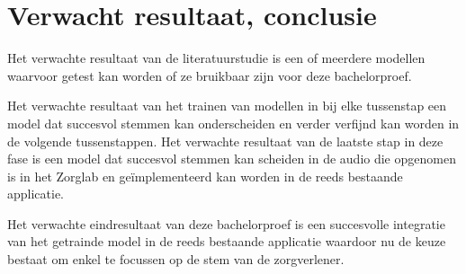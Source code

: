 \section{Verwacht resultaat, conclusie}%
\label{sec:verwachte_resultaten}

Het verwachte resultaat van de literatuurstudie is een of meerdere modellen waarvoor getest kan worden of ze bruikbaar zijn voor deze bachelorproef.

Het verwachte resultaat van het trainen van modellen in bij elke tussenstap een model dat succesvol stemmen kan onderscheiden en verder verfijnd kan worden in de volgende tussenstappen. Het verwachte resultaat van de laatste stap in deze fase is een model dat succesvol stemmen kan scheiden in de audio die opgenomen is in het Zorglab en geïmplementeerd kan worden in de reeds bestaande applicatie.

Het verwachte eindresultaat van deze bachelorproef is een succesvolle integratie van het getrainde model in de reeds bestaande applicatie waardoor nu de keuze bestaat om enkel te focussen op de stem van de zorgverlener.
